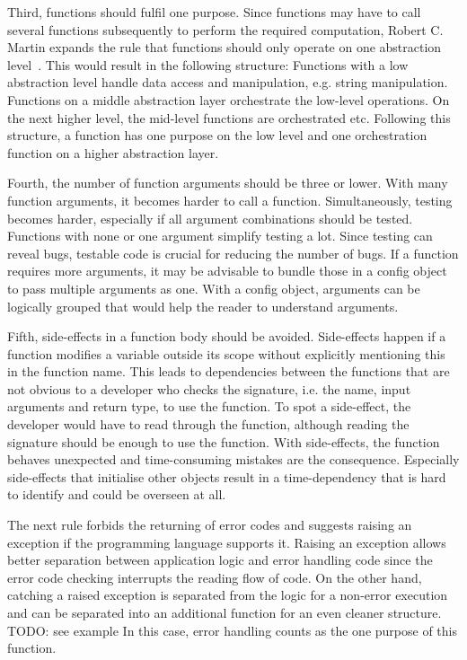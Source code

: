 Third, functions should fulfil one purpose. Since functions may have to call several functions subsequently to perform the required computation, Robert C. Martin expands the rule that functions should only operate on one abstraction level~\cite{martin_clean_2009}. This would result in the following structure:
Functions with a low abstraction level handle data access and manipulation, e.g. string manipulation. Functions on a middle abstraction layer orchestrate the low-level operations. On the next higher level, the mid-level functions are orchestrated etc. Following this structure, a function has one purpose on the low level and one orchestration function on a higher abstraction layer. 

Fourth, the number of function arguments should be three or lower. With many function arguments, it becomes harder to call a function. Simultaneously, testing becomes harder, especially if all argument combinations should be tested. Functions with none or one argument simplify testing a lot. Since testing can reveal bugs, testable code is crucial for reducing the number of bugs.
If a function requires more arguments, it may be advisable to bundle those in a config object to pass multiple arguments as one. With a config object, arguments can be logically grouped that would help the reader to understand arguments. 

Fifth, side-effects in a function body should be avoided. Side-effects happen if a function modifies a variable outside its scope without explicitly mentioning this in the function name. This leads to dependencies between the functions that are not obvious to a developer who checks the signature, i.e. the name, input arguments and return type, to use the function. To spot a side-effect, the developer would have to read through the function, although reading the signature should be enough to use the function. With side-effects, the function behaves unexpected and time-consuming mistakes are the consequence. Especially side-effects that initialise other objects result in a time-dependency that is hard to identify and could be overseen at all.

The next rule forbids the returning of error codes and suggests raising an exception if the programming language supports it. Raising an exception allows better separation between application logic and error handling code since the error code checking interrupts the reading flow of code. On the other hand, catching a raised exception is separated from the logic for a non-error execution and can be separated into an additional function for an even cleaner structure. TODO: see example In this case, error handling counts as the one purpose of this function.

